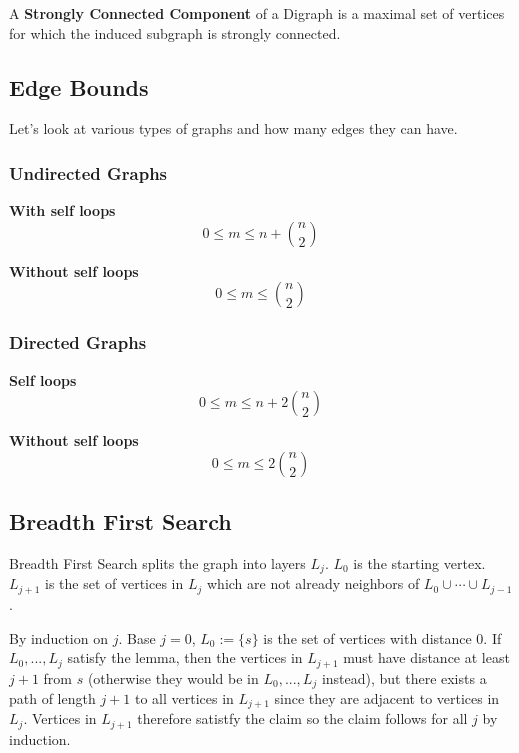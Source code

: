 \documentclass[12pt]{article}
\begin{document}
   {
    A {\bf Strongly Connected Component} of a Digraph is a maximal set of vertices
    for which the induced subgraph is strongly connected.
  }


  \subsection{Edge Bounds}

  Let's look at various types of graphs and how many edges they can have.
  
  \begin{multicols}{2}
    \subsubsection{Undirected Graphs}

    {\bf With self loops}
    \[
      0 \le m \le n + \binom{n}{2}
    \]

    {\bf Without self loops}
    \[
      0 \le m \le \binom{n}{2}
    \]

    \subsubsection{Directed Graphs}

    {\bf Self loops}
    \[
      0 \le m \le n + 2\binom{n}{2}
    \]

    {\bf Without self loops}
    \[
      0 \le m \le 2\binom{n}{2}
    \]
  \end{multicols}




  \subsection{Breadth First Search}

  Breadth First Search splits the graph into layers $L_j$. $L_0$ is the starting
  vertex. $L_{j + 1}$ is the set of vertices in $L_j$ which are not already
  neighbors of $L_0 \cup \cdots \cup L_{j - 1}$.

  {
    By induction on $j$. Base $j = 0$, $L_0 := \{s\}$ is the set of vertices
    with distance $0$. If $L_0, ..., L_j$ satisfy the lemma, then the vertices
    in $L_{j + 1}$ must have distance at least $j + 1$ from $s$ (otherwise they
    would be in $L_0, ..., L_j$ instead), but there exists a path of length $j +
    1$ to all vertices in $L_{j + 1}$ since they are adjacent to vertices in
    $L_j$. Vertices in $L_{j + 1}$ therefore satistfy the claim so the claim
    follows for all $j$ by induction.
  }
\end{document}
